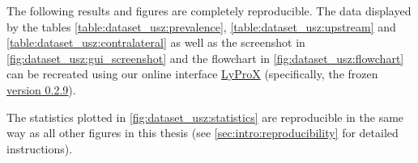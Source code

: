 \begin{tcolorbox}[
    title=\faIcon{recycle} Reproducibility,
    parbox=false,
    float
]
    The following results and figures are completely reproducible. The data displayed by the tables \cref{table:dataset_usz:prevalence}, \cref{table:dataset_usz:upstream} and \cref{table:dataset_usz:contralateral} as well as the screenshot in \cref{fig:dataset_usz:gui_screenshot} and the flowchart in \cref{fig:dataset_usz:flowchart} can be recreated using our online interface \href{https://lyprox.org}{ LyProX} (specifically, the frozen \href{https://2021-oropharynx.lyprox.org}{ version 0.2.9}).
    
    The statistics plotted in \cref{fig:dataset_usz:statistics} are reproducible in the same way as all other figures in this thesis (see \cref{sec:intro:reproducibility} for detailed instructions).
\end{tcolorbox}
